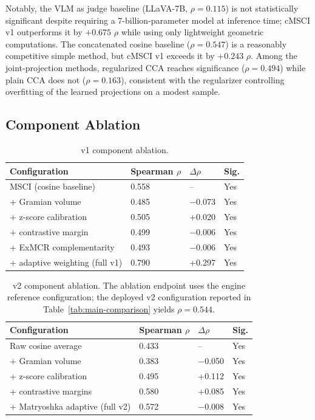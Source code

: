 Notably, the VLM as judge baseline (LLaVA-7B, $\rho = 0.115$) is not statistically significant despite requiring a 7-billion-parameter model at inference time; cMSCI v1 outperforms it by $+0.675$ $\rho$ while using only lightweight geometric computations. The concatenated cosine baseline ($\rho = 0.547$) is a reasonably competitive simple method, but cMSCI v1 exceeds it by $+0.243$ $\rho$. Among the joint-projection methods, regularized CCA reaches significance ($\rho = 0.494$) while plain CCA does not ($\rho = 0.163$), consistent with the regularizer controlling overfitting of the learned projections on a modest sample.

\subsection{Component Ablation}\label{sec:ablation}

\begin{table}[t]
\caption{v1 component ablation.}\label{tab:v1-ablation}
\centering
\begin{tabular}{llll}
\toprule
Configuration & Spearman $\rho$ & $\Delta\rho$ & Sig. \\
\midrule
MSCI (cosine baseline) & 0.558 & -- & Yes \\
+ Gramian volume & 0.485 & $-$0.073 & Yes \\
+ z-score calibration & 0.505 & +0.020 & Yes \\
+ contrastive margin & 0.499 & $-$0.006 & Yes \\
+ ExMCR complementarity & 0.493 & $-$0.006 & Yes \\
+ adaptive weighting (full v1) & 0.790 & +0.297 & Yes \\
\bottomrule
\end{tabular}
\end{table}

\begin{table}[t]
\caption{v2 component ablation. The ablation endpoint uses the engine reference configuration; the deployed v2 configuration reported in Table~\ref{tab:main-comparison} yields $\rho = 0.544$.}\label{tab:v2-ablation}
\centering
\begin{tabular}{llll}
\toprule
Configuration & Spearman $\rho$ & $\Delta\rho$ & Sig. \\
\midrule
Raw cosine average & 0.433 & -- & Yes \\
+ Gramian volume & 0.383 & $-$0.050 & Yes \\
+ z-score calibration & 0.495 & +0.112 & Yes \\
+ contrastive margins & 0.580 & +0.085 & Yes \\
+ Matryoshka adaptive (full v2) & 0.572 & $-$0.008 & Yes \\
\bottomrule
\end{tabular}
\end{table}

